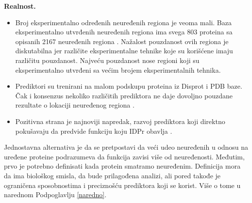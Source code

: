 \textbf{Realnost.} 
\begin{itemize}
  \item Broj eksperimentalno određenih neuređenih regiona je veoma mali.
    Baza eksperimentalno utvrđenih neuređenih regiona  ima
    svega 803 proteina sa opisanih 2167 neuređenih regiona \parencite{Piovesan2016}.
    Nažalost pouzdanost ovih regiona je diskutabilna jer različite
    eksperimentalne tehnike koje su korišćene imaju različitu pouzdanost.
    Najveću pouzdanost nose regioni koji su eksperimentalno utvrđeni sa 
    većim brojem eksperimentalnih tehnika.
  \item Prediktori su trenirani na malom podskupu proteina iz Disprot i PDB  baze.
    Čak i konsenzus nekoliko različitih prediktora ne daje dovoljno pouzdane
    rezultate o lokaciji neuređenog regiona \parencite{Mitic}.
  \item 
    Pozitivna strana je najnoviji napredak, razvoj prediktora koji direktno
    pokušavaju da predvide funkciju koju IDPr obavlja \parencite{Meng_c2017}.

\end{itemize}

Jednostavna alternativa je da se pretpostavi da veći udeo neuređenih u odnosu
na uređene proteine podrazumeva da funkcija zavisi više od neuređenosti. 
Međutim, prvo je potrebno definisati kada protein smatramo
neuređenim.  Definicija mora da ima biološkog smisla, da bude prilagođena
analizi, ali pored takođe je ograničena sposobnostima i preciznošću prediktora
koji se korist.  Više o tome u narednom Podpoglavlju \ref{naredno}.

